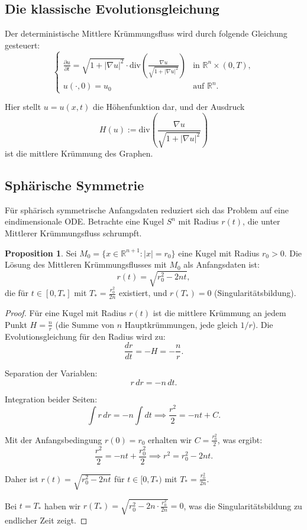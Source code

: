 \documentclass[a4paper,12pt]{article}
\theoremstyle{definition}
\newtheorem{proposition}{Proposition}
\begin{document}
\subsection{Die klassische Evolutionsgleichung}

Der deterministische Mittlere Krümmungsfluss wird durch folgende Gleichung gesteuert:
\begin{equation}
\label{eq:mcf_deterministic}
\begin{cases}
\frac{\partial u}{\partial t} = \sqrt{1 + |\nabla u|^2} \cdot \text{div}\left( \frac{\nabla u}{\sqrt{1 + |\nabla u|^2}} \right) & \text{in } \mathbb{R}^n \times (0,T), \\
u(\cdot, 0) = u_0 & \text{auf } \mathbb{R}^n.
\end{cases}
\end{equation}

Hier stellt $u = u(x, t)$ die Höhenfunktion dar, und der Ausdruck
\[
H(u) := \text{div}\left( \frac{\nabla u}{\sqrt{1 + |\nabla u|^2}} \right)
\]
ist die mittlere Krümmung des Graphen.

\subsection{Sphärische Symmetrie}

Für sphärisch symmetrische Anfangsdaten reduziert sich das Problem auf eine eindimensionale ODE. Betrachte eine Kugel $S^n$ mit Radius $r(t)$, die unter Mittlerer Krümmungsfluss schrumpft.

\begin{proposition}
	Sei $M_0 = \{x \in \mathbb{R}^{n+1} : |x| = r_0\}$ eine Kugel mit Radius $r_0 > 0$. Die Lösung des Mittleren Krümmungsflusses mit $M_0$ als Anfangsdaten ist:
	\[
	r(t) = \sqrt{r_0^2 - 2nt},
	\]
	die für $t \in [0, T_*]$ mit $T_* = \frac{r_0^2}{2n}$ existiert, und $r(T_*) = 0$ (Singularitätsbildung).
\end{proposition}

\begin{proof}
	Für eine Kugel mit Radius $r(t)$ ist die mittlere Krümmung an jedem Punkt $H = \frac{n}{r}$ (die Summe von $n$ Hauptkrümmungen, jede gleich $1/r$). Die Evolutionsgleichung für den Radius wird zu:
	\[
	\frac{dr}{dt} = -H = -\frac{n}{r}.
	\]
	
	Separation der Variablen:
	\[
	r \, dr = -n \, dt.
	\]
	
	Integration beider Seiten:
	\[
	\int r \, dr = -n \int dt \implies \frac{r^2}{2} = -nt + C.
	\]
	
	Mit der Anfangsbedingung $r(0) = r_0$ erhalten wir $C = \frac{r_0^2}{2}$, was ergibt:
	\[
	\frac{r^2}{2} = -nt + \frac{r_0^2}{2} \implies r^2 = r_0^2 - 2nt.
	\]
	
	Daher ist $r(t) = \sqrt{r_0^2 - 2nt}$ für $t \in [0, T_*)$ mit $T_* = \frac{r_0^2}{2n}$.
	
	Bei $t = T_*$ haben wir $r(T_*) = \sqrt{r_0^2 - 2n \cdot \frac{r_0^2}{2n}} = 0$, was die Singularitätsbildung zu endlicher Zeit zeigt.
\end{proof}
\end{document}
